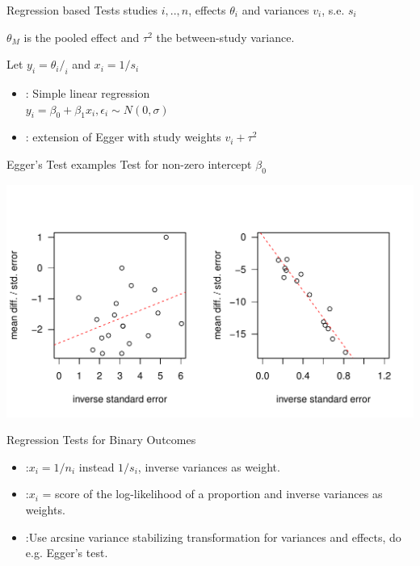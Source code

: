 \documentclass[english]{beamer}\usepackage[]{graphicx}\usepackage[]{color}
\makeatletter
\def\maxwidth{ %
  \ifdim\Gin@nat@width>\linewidth
    \linewidth
  \else
    \Gin@nat@width
  \fi
}
\newenvironment{knitrout}{}{} %
\makeatother
\begin{document}
\begin{frame}{Regression based Tests}
studies $i,.. ,n$, effects $\theta_i$ and variances $v_i$, s.e. $s_i$

$\theta_M$ is the pooled effect and $\tau^2$ the between-study variance.

Let $y_{i} = \theta_{i}/_{i}$ and $x_i = 1/s_i$
\begin{itemize}
\item \citet{Egger} : Simple linear regression \\ $y_i = \beta_0 + \beta_1 x_i, \epsilon_i \sim N(0, \sigma)$
\item \citet{thompson.sharp} : extension of Egger with study weights $v_{i} + \tau^2$ 
\end{itemize}

\end{frame}

\begin{frame}[fragile]{Egger's Test examples}
Test for non-zero intercept $\beta_{0}$

\vspace{-1.1cm}
\begin{knitrout}
\color{fgcolor}
\includegraphics[width=\maxwidth]{figure/unnamed-chunk-6-1} 

\end{knitrout}
\end{frame}


\begin{frame}{Regression Tests for Binary Outcomes}

\begin{itemize}
\item \citet{Peters} :$x_i = 1/n_i$ instead $1/s_i$, inverse variances as weight.
\item \citet{Harbord} :$x_i$ = score of the log-likelihood of a proportion and inverse variances as weights.
\item \citet{Rucker} :Use arcsine variance stabilizing transformation for variances and effects, do e.g. Egger's test.
\end{itemize}
\end{frame}
\end{document}
